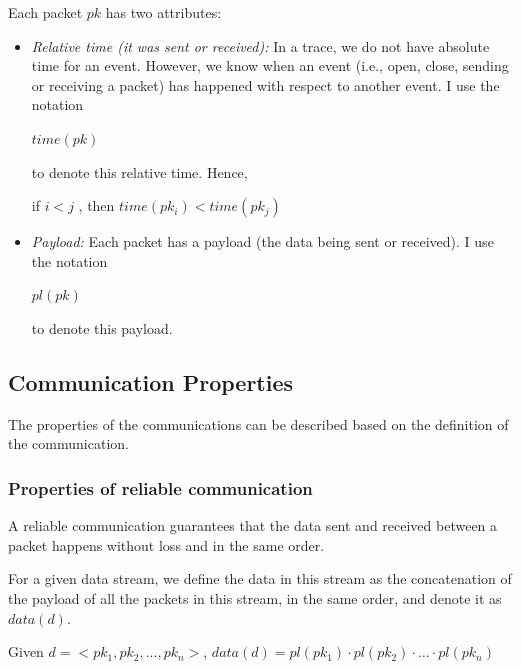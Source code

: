 \documentclass[12pt,oneside]{book}
\begin{document}
Each packet $pk$ has two attributes:
\begin{itemize}
\item \textit{Relative time (it was sent or received):} In a trace, we do not have absolute time for an event. However, we know when an event (i.e., open, close, sending or receiving a packet) has happened with respect to another event. I use the notation 

$time(pk)$

to denote this relative time. Hence, 

if  $i < j $ , then  $time(pk_i) < time(pk_j)$

\item \textit{Payload:} Each packet has a payload (the data being sent or received). I use the notation 

$pl(pk)$ 

to denote this payload. 

\end{itemize}


\subsection{Communication Properties}\label{properties}
The properties of the communications can be described based on the definition of the communication.

\subsubsection{Properties of reliable communication}\label{reliablepro}
A reliable communication guarantees that the data sent and received between a packet happens without loss and in the same order.

For a given data stream, we define the data in this stream as the concatenation of the payload of all the packets in this stream, in the same order, and denote it as $data(d)$.

Given $ d=<pk_1, pk_2, ..., pk_n>$, $data(d)=pl(pk_1) \cdot pl(pk_2)\cdot \ldots \cdot pl(pk_n)$
\end{document}
